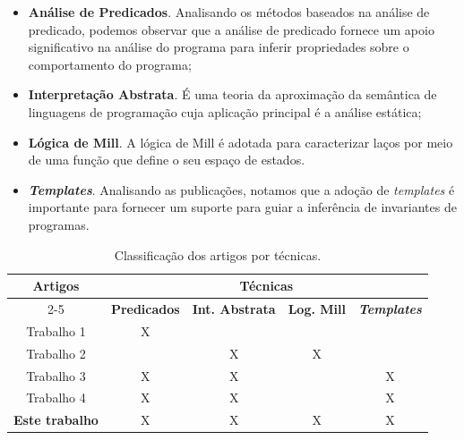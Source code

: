 \begin{itemize}
    \item \textbf{Análise de Predicados}. Analisando os métodos baseados na análise de predicado, podemos observar que a análise de predicado fornece um apoio significativo na análise do programa para inferir propriedades sobre o comportamento do programa;
    \item \textbf{Interpretação Abstrata}. É uma teoria da aproximação da semântica de linguagens de programação cuja aplicação principal é a análise estática;
    \item \textbf{Lógica de Mill}. A lógica de Mill é adotada para caracterizar laços por meio de uma função que define o seu espaço de estados.
    \item \textbf{\textit{Templates}}. Analisando as publicações, notamos que a adoção de \textit{templates} é importante para fornecer um suporte para guiar a inferência de invariantes de programas.
\end{itemize}{}

\begin{table}[htbp]  
  \centering  
  \begin{tabular}{|c|c|c|c|c|}
    \hline
    \multicolumn{1}{|c|}{\multirow{2}{*}{\textbf{Artigos}}} & 
    \multicolumn{4}{c|}{\textbf{Técnicas}} \bigstrut\\
    \cline{2-5} &
    \textbf{Predicados} & \textbf{Int. Abstrata} & \textbf{Log. Mill} & \textbf{\textit{Templates}} \bigstrut\\
    \hline
    Trabalho 1 & X &  &  &  \bigstrut\\
    \hline
    Trabalho 2 &  & X & X &  \bigstrut\\
    \hline
    Trabalho 3 & X & X &  & X \bigstrut\\
    \hline
    Trabalho 4 & X & X &  & X \bigstrut\\
    \hline
    \textbf{Este trabalho} & X & X & X & X \bigstrut\\
    \hline
  \end{tabular}  
  \caption{Classificação dos artigos por técnicas.}
  \label{Table:TechByPapers}
\end{table}%
